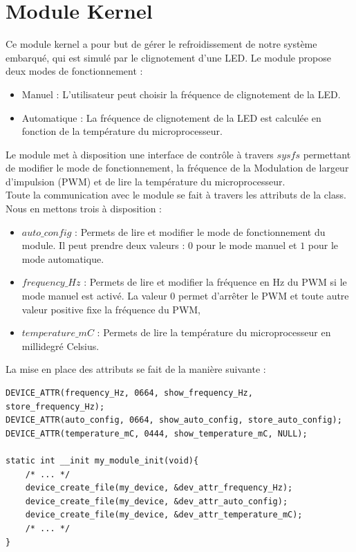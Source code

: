 \documentclass[
	a4paper, %
	10pt, %
]{CSUniSchoolLabReport}
\begin{document}
\section{Module Kernel}\label{ModuleKernel}
Ce module kernel a pour but de gérer le refroidissement de notre système embarqué, qui est simulé par le clignotement d'une LED. Le module propose deux modes de fonctionnement :
\begin{itemize}
	\item Manuel : L'utilisateur peut choisir la fréquence de clignotement de la LED.
	\item Automatique : La fréquence de clignotement de la LED est calculée en fonction de la température du microprocesseur.
\end{itemize}

Le module met à disposition une interface de contrôle à travers $sysfs$ permettant de modifier le mode de fonctionnement, la fréquence de la Modulation de largeur d'impulsion (PWM) et de lire la température du microprocesseur. \\

Toute la communication avec le module se fait à travers les attributs de la class. Nous en mettons trois à disposition :
\begin{itemize}
	\item $auto\_config$ : Permets de lire et modifier le mode de fonctionnement du module. Il peut prendre deux valeurs : $0$ pour le mode manuel et $1$ pour le mode automatique.
	\item $frequency\_Hz$ : Permets de lire et modifier la fréquence en Hz du PWM si le mode manuel est activé. La valeur $0$ permet d'arrêter le PWM et toute autre valeur positive fixe la fréquence du PWM, 
	\item $temperature\_mC$ : Permets de lire la température du microprocesseur en millidegré Celsius.
\end{itemize}

La mise en place des attributs se fait de la manière suivante :
\begin{lstlisting}[style=CStyle]
DEVICE_ATTR(frequency_Hz, 0664, show_frequency_Hz, store_frequency_Hz);
DEVICE_ATTR(auto_config, 0664, show_auto_config, store_auto_config);
DEVICE_ATTR(temperature_mC, 0444, show_temperature_mC, NULL);

static int __init my_module_init(void){
	/* ... */
	device_create_file(my_device, &dev_attr_frequency_Hz);
	device_create_file(my_device, &dev_attr_auto_config);
	device_create_file(my_device, &dev_attr_temperature_mC);
	/* ... */
}
\end{lstlisting}
\end{document}

